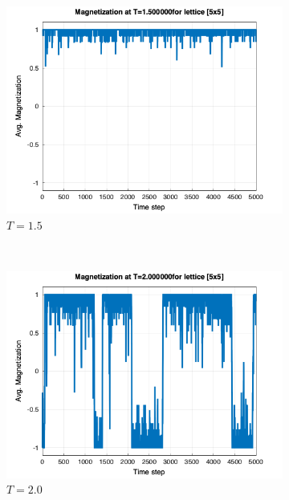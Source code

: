 \begin{figure}[t]
\begin{subfigure}{0.5\textwidth}
		\includegraphics[width=\textwidth]{./img/mag_time_1.500000_5.png}
		\caption{$T=1.5$}
		\label{sfig:p3}
	\end{subfigure}%
	~
	\begin{subfigure}{0.5\textwidth}
		\includegraphics[width=\textwidth]{./img/mag_time_2.000000_5.png}
		\caption{$T=2.0$}
		\label{sfig:p4}
	\end{subfigure}\\
	\begin{subfigure}{0.5\textwidth}

\end{subfigure}
\end{figure}
